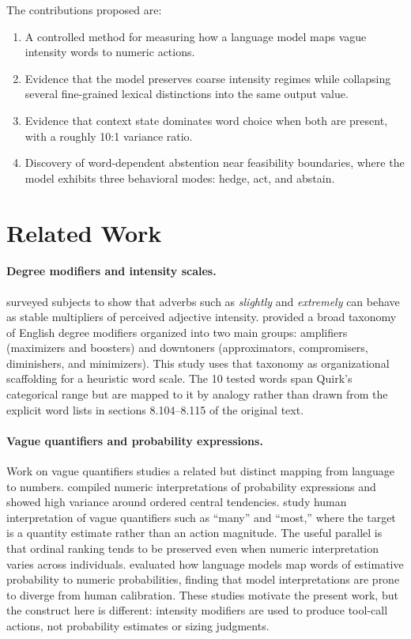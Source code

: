 \documentclass[11pt]{article}
\begin{document}
The contributions proposed are:
\begin{enumerate}
    \item A controlled method for measuring how a language model maps vague intensity words to numeric actions.
    \item Evidence that the model preserves coarse intensity regimes while collapsing several fine-grained lexical distinctions into the same output value.
    \item Evidence that context state dominates word choice when both are present, with a roughly 10:1 variance ratio.
    \item Discovery of word-dependent abstention near feasibility boundaries, where the model exhibits three behavioral modes: hedge, act, and abstain.
\end{enumerate}

\section{Related Work}

\paragraph{Degree modifiers and intensity scales.}
\citet{cliff1959} surveyed subjects to show that adverbs such as \textit{slightly} and \textit{extremely} can behave as stable multipliers of perceived adjective intensity. \citet{quirk1985} provided a broad taxonomy of English degree modifiers organized into two main groups: amplifiers (maximizers and boosters) and downtoners (approximators, compromisers, diminishers, and minimizers). This study uses that taxonomy as organizational scaffolding for a heuristic word scale. The 10 tested words span Quirk's categorical range but are mapped to it by analogy rather than drawn from the explicit word lists in sections 8.104--8.115 of the original text.

\paragraph{Vague quantifiers and probability expressions.}
Work on vague quantifiers studies a related but distinct mapping from language to numbers. \citet{mosteller1990} compiled numeric interpretations of probability expressions and showed high variance around ordered central tendencies. \citet{ramotowska2024} study human interpretation of vague quantifiers such as ``many'' and ``most,'' where the target is a quantity estimate rather than an action magnitude. The useful parallel is that ordinal ranking tends to be preserved even when numeric interpretation varies across individuals. \citet{zhang2024} evaluated how language models map words of estimative probability to numeric probabilities, finding that model interpretations are prone to diverge from human calibration. These studies motivate the present work, but the construct here is different: intensity modifiers are used to produce tool-call actions, not probability estimates or sizing judgments.
\end{document}
